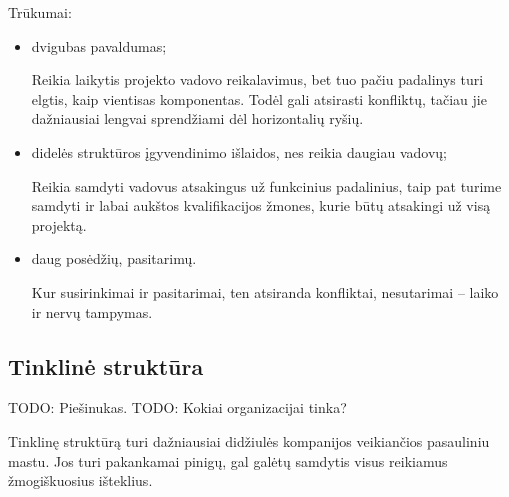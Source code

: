 Trūkumai:
\begin{itemize}
  \item dvigubas pavaldumas;
    \begin{note}
      Reikia laikytis projekto vadovo reikalavimus, bet tuo pačiu
      padalinys turi elgtis, kaip vientisas komponentas. Todėl gali
      atsirasti konfliktų, tačiau jie dažniausiai lengvai sprendžiami
      dėl horizontalių ryšių.
    \end{note}
  \item didelės struktūros įgyvendinimo išlaidos, nes reikia daugiau
    vadovų;
    \begin{note}
      Reikia samdyti vadovus atsakingus už funkcinius padalinius, taip
      pat turime samdyti ir labai aukštos kvalifikacijos žmones, kurie
      būtų atsakingi už visą projektą.
    \end{note}
  \item daug posėdžių, pasitarimų.
    \begin{note}
      Kur susirinkimai ir pasitarimai, ten atsiranda konfliktai,
      nesutarimai – laiko ir nervų tampymas.
    \end{note}
\end{itemize}

\subsection{Tinklinė struktūra}

TODO: Piešinukas.
TODO: Kokiai organizacijai tinka?

Tinklinę struktūrą turi dažniausiai didžiulės kompanijos veikiančios
pasauliniu mastu. Jos turi pakankamai pinigų, gal galėtų samdytis
visus reikiamus žmogiškuosius išteklius.


